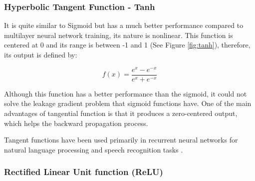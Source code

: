 \subsubsection{Hyperbolic Tangent Function - Tanh}

It is quite similar to Sigmoid but has a much better performance compared to multilayer neural network training, its nature is nonlinear. This function is centered at 0 and its range is between -1 and 1 (See Figure \ref{fig:tanh}), therefore, its output is defined by:

\begin{equation}
f(x)=\frac{e^{x}-e^{-x}}{e^{x}+e^{-x}}
\end{equation}
 
Although this function has a better performance than the sigmoid, it could not solve the leakage gradient problem that sigmoid functions have. One of the main advantages of  tangential function is that it produces a zero-centered output, which helps the backward propagation process.   

\vspace{5mm} %

Tangent functions have been used primarily in recurrent neural networks for natural language processing \cite{Reference43} and speech recognition tasks \cite{Reference44}.
    
\subsubsection{Rectified Linear Unit function (ReLU)}

